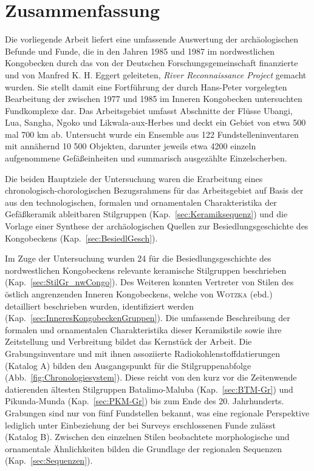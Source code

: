 \chapter{Zusammenfassung}\label{sec:Zusammenfassung}
\begin{multicols}{2}
\raggedcolumns
\noindent Die vorliegende Arbeit liefert eine umfassende Auswertung der archäologischen Befunde und Funde, die in den Jahren 1985 und 1987 im nordwestlichen Kongobecken durch das von der Deutschen Forschungsgemeinschaft finanzierte und von Manfred K. H. Eggert geleiteten, \textit{River Reconnaissance Project} gemacht wurden. Sie stellt damit eine Fortführung der durch Hans-Peter \textcite{Wotzka.1995} vorgelegten Bearbeitung der zwischen 1977 und 1985 im Inneren Kongobecken untersuchten Fundkomplexe dar. Das Arbeitsgebiet umfasst Abschnitte der Flüsse Ubangi, Lua, Sangha, Ngoko und Likwala-aux-Herbes und deckt ein Gebiet von etwa 500 mal 700 km ab. Untersucht wurde ein Ensemble aus 122 Fundstelleninventaren mit annähernd 10 500 Objekten, darunter jeweils etwa 4200 einzeln aufgenommene Gefäßeinheiten und summarisch ausgezählte Einzelscherben.

Die beiden Hauptziele der Untersuchung waren die Erarbeitung eines chronologisch-chorologischen Bezugsrahmens für das Arbeitsgebiet auf Basis der aus den technologischen, formalen und ornamentalen Charakteristika der Gefäßkeramik ableitbaren Stilgruppen (Kap.~\ref{sec:Keramiksequenz}) und die Vorlage einer Synthese der archäologischen Quellen zur Besiedlungsgeschichte des Kongobeckens (Kap.~\ref{sec:BesiedlGesch}).

Im Zuge der Untersuchung wurden 24 für die Besiedlungsgeschichte des nordwestlichen Kongobeckens relevante keramische Stilgruppen beschrieben (Kap.~\ref{sec:StilGr_nwCongo}). Des Weiteren konnten Vertreter von Stilen des östlich angrenzenden Inneren Kongobeckens, welche von \textsc{Wotzka} (ebd.) detailliert beschrieben wurden, identifiziert werden (Kap.~\ref{sec:InneresKongobeckenGruppen}). Die umfassende Beschreibung der formalen und ornamentalen Charakteristika dieser Keramikstile sowie ihre Zeitstellung und Verbreitung bildet das Kernstück der Arbeit. Die Grabungsinventare und mit ihnen assoziierte Radiokohlenstoffdatierungen (Katalog A) bilden den Ausgangspunkt für die Stilgruppenabfolge (Abb.~\ref{fig:Chronologiesystem}). Diese reicht von den kurz vor die Zeitenwende datierenden ältesten Stilgruppen Batalimo-Maluba (Kap.~\ref{sec:BTM-Gr}) und Pikunda-Munda (Kap.~\ref{sec:PKM-Gr}) bis zum Ende des 20. Jahrhunderts. Grabungen sind nur von fünf Fundstellen bekannt, was eine regionale Perspektive lediglich unter Einbeziehung der bei Surveys erschlossenen Funde zulässt (Katalog B). Zwischen den einzelnen Stilen beobachtete morphologische und ornamentale Ähnlichkeiten bilden die Grundlage der regionalen Sequenzen (Kap.~\ref{sec:Sequenzen}).


\end{multicols}
